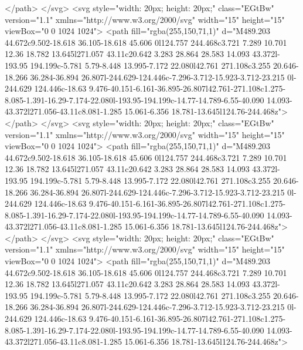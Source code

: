                       </path>
                    </svg>
                    <svg style="width: 20px; height: 20px;" class="EGtBw" version="1.1"
                      xmlns="http://www.w3.org/2000/svg" width="15" height="15" viewBox="0 0 1024 1024">
                      <path fill="rgba(255,150,71,1)"
                        d="M489.203 44.672c9.502-18.618 36.105-18.618 45.606 0l124.757 244.468c3.721 7.289 10.701 12.36 18.782 13.645l271.057 43.11c20.642 3.283 28.864 28.583 14.093 43.372l-193.95 194.199c-5.781 5.79-8.448 13.995-7.172 22.080l42.761 271.108c3.255 20.646-18.266 36.284-36.894 26.807l-244.629-124.446c-7.296-3.712-15.923-3.712-23.215 0l-244.629 124.446c-18.63 9.476-40.151-6.161-36.895-26.807l42.761-271.108c1.275-8.085-1.391-16.29-7.174-22.080l-193.95-194.199c-14.77-14.789-6.55-40.090 14.093-43.372l271.056-43.11c8.081-1.285 15.061-6.356 18.781-13.645l124.76-244.468z">
                      </path>
                    </svg>
                    <svg style="width: 20px; height: 20px;" class="EGtBw" version="1.1"
                      xmlns="http://www.w3.org/2000/svg" width="15" height="15" viewBox="0 0 1024 1024">
                      <path fill="rgba(255,150,71,1)"
                        d="M489.203 44.672c9.502-18.618 36.105-18.618 45.606 0l124.757 244.468c3.721 7.289 10.701 12.36 18.782 13.645l271.057 43.11c20.642 3.283 28.864 28.583 14.093 43.372l-193.95 194.199c-5.781 5.79-8.448 13.995-7.172 22.080l42.761 271.108c3.255 20.646-18.266 36.284-36.894 26.807l-244.629-124.446c-7.296-3.712-15.923-3.712-23.215 0l-244.629 124.446c-18.63 9.476-40.151-6.161-36.895-26.807l42.761-271.108c1.275-8.085-1.391-16.29-7.174-22.080l-193.95-194.199c-14.77-14.789-6.55-40.090 14.093-43.372l271.056-43.11c8.081-1.285 15.061-6.356 18.781-13.645l124.76-244.468z">
                      </path>
                    </svg>
                    <svg style="width: 20px; height: 20px;" class="EGtBw" version="1.1"
                      xmlns="http://www.w3.org/2000/svg" width="15" height="15" viewBox="0 0 1024 1024">
                      <path fill="rgba(255,150,71,1)"
                        d="M489.203 44.672c9.502-18.618 36.105-18.618 45.606 0l124.757 244.468c3.721 7.289 10.701 12.36 18.782 13.645l271.057 43.11c20.642 3.283 28.864 28.583 14.093 43.372l-193.95 194.199c-5.781 5.79-8.448 13.995-7.172 22.080l42.761 271.108c3.255 20.646-18.266 36.284-36.894 26.807l-244.629-124.446c-7.296-3.712-15.923-3.712-23.215 0l-244.629 124.446c-18.63 9.476-40.151-6.161-36.895-26.807l42.761-271.108c1.275-8.085-1.391-16.29-7.174-22.080l-193.95-194.199c-14.77-14.789-6.55-40.090 14.093-43.372l271.056-43.11c8.081-1.285 15.061-6.356 18.781-13.645l124.76-244.468z">
